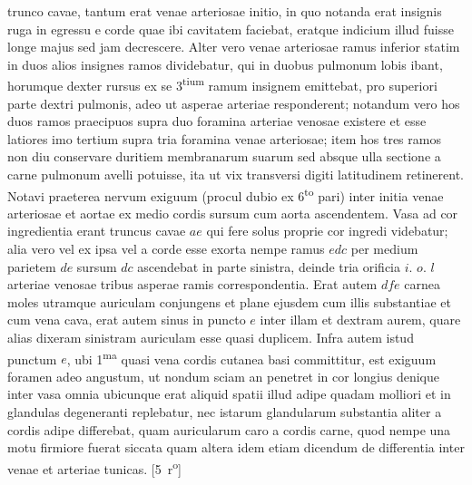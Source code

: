  trunco cavae,
tantum erat venae arteriosae initio, in quo notanda erat insignis ruga in egressu e corde quae ibi cavitatem faciebat, eratque indicium illud fuisse longe majus sed jam decrescere.
\pend%
\pstart%
Alter vero venae arteriosae ramus inferior statim in duos alios insignes ramos dividebatur, qui in duobus pulmonum lobis ibant, horumque dexter rursus ex se 3\textsuperscript{tium} ramum insignem emittebat, pro superiori parte dextri pulmonis, adeo ut
asperae arteriae responderent; notandum vero hos duos ramos praecipuos supra duo foramina arteriae venosae existere et esse latiores imo tertium supra tria foramina venae arteriosae; item hos tres ramos non diu conservare duritiem membranarum suarum sed absque ulla sectione a carne pulmonum avelli potuisse, ita ut vix transversi digiti latitudinem retinerent.
\pend%
\pstart%
Notavi praeterea nervum exiguum (procul dubio ex 6\textsuperscript{to} pari) inter initia venae arteriosae et aortae ex medio cordis sursum cum aorta ascendentem. Vasa ad cor ingredientia erant truncus cavae $ae$ qui fere solus proprie cor ingredi videbatur; alia vero vel ex ipsa vel a corde esse exorta nempe ramus $edc$ per medium parietem $de$ sursum $dc$ ascendebat in parte sinistra, deinde tria orificia $i.$ $o.$ $l$ arteriae venosae tribus asperae ramis correspondentia. Erat autem $dfe$ carnea moles utramque auriculam conjungens et plane ejusdem cum illis substantiae et cum vena cava, erat autem sinus in puncto $e$ inter illam et dextram aurem, quare alias dixeram sinistram auriculam esse quasi duplicem. Infra autem istud punctum $e$, ubi 1\textsuperscript{ma} quasi vena cordis cutanea basi committitur, est exiguum foramen\label{foramen} adeo angustum, ut nondum sciam an penetret in cor longius denique inter vasa omnia ubicunque erat aliquid spatii illud adipe quadam molliori et in glandulas degeneranti replebatur, nec istarum glandularum substantia aliter a cordis adipe differebat, quam auricularum caro a cordis carne, quod nempe una motu firmiore fuerat siccata quam altera idem etiam dicendum de differentia inter venae et arteriae tunicas.
[5~r\textsuperscript{o}]
\pend
